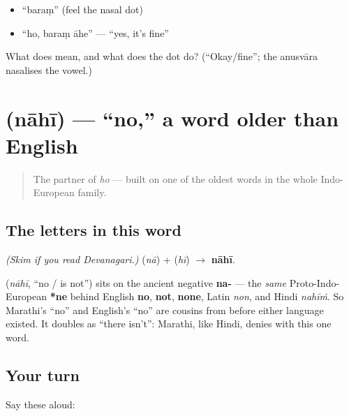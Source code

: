 \begin{itemize}
\raggedright
  \item \textquotedblleft{}baraṃ\textquotedblright{} (feel the nasal dot)
  \item \textquotedblleft{}ho, baraṃ āhe\textquotedblright{} — \textquotedblleft{}yes, it's fine\textquotedblright{}
\end{itemize}

\begin{tcolorbox}[breakable,colback=teal!4,colframe=teal!35!black,title={Before you move on}]
What does \textbf{} mean, and what does the dot \textbf{} do? (\textquotedblleft{}Okay/fine\textquotedblright{}; the anusvāra nasalises the vowel.)
\end{tcolorbox}
\section[nahi]{ (nāhī) — \textquotedblleft{}no,\textquotedblright{} a word older than English}

\label{lesson:MR-C01-nahi}



\begin{quote}
The partner of \emph{ho} — built on one of the oldest words in the whole Indo-European family.
\end{quote}

\subsection*{The letters in this word}
\emph{(Skim if you read Devanagari.)} \textbf{} (\emph{nā}) + \textbf{} (\emph{hī}) $\to$ \textbf{nāhī}.

\begin{cousinweb}
\textbf{} (\emph{nāhī}, \textquotedblleft{}no / is not\textquotedblright{}) sits on the ancient negative \textbf{na-} — the \emph{same} Proto-Indo-European \textbf{*ne} behind English \textbf{no}, \textbf{not}, \textbf{none}, Latin \emph{non}, and Hindi \emph{nahīṁ}. So Marathi's \textquotedblleft{}no\textquotedblright{} and English's \textquotedblleft{}no\textquotedblright{} are cousins from before either language existed. It doubles as \textquotedblleft{}there isn't\textquotedblright{}: Marathi, like Hindi, denies with this one word.
\end{cousinweb}

\subsection*{Your turn}
Say these aloud:

